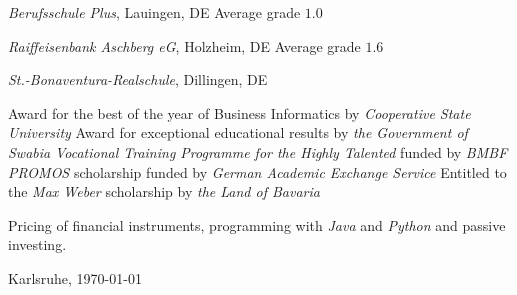 \documentclass[10pt]{article}
\begin{document}
 \vspace{0.01in} 
\newline \emph{Berufsschule Plus}, Lauingen, DE
\newline\noindent Average grade $1.0$
\medskip

 \vspace{0.01in} 
\newline \noindent \emph{Raiffeisenbank Aschberg eG}, Holzheim, DE
\newline\noindent Average grade $1.6$
\medskip

 \vspace{0.01in} 
\newline \noindent \emph{St.-Bonaventura-Realschule}, Dillingen, DE
\medskip

\medskip
{}
\noindent Award for the best of the year of Business Informatics by \textit{Cooperative State University} 
\medskip
\newline\noindent Award for exceptional educational results by \textit{the Government of Swabia} 
\medskip
\bigskip
{}
\newline\noindent \textit{Vocational Training Programme for the Highly Talented} funded by \textit{BMBF} 
\medskip
\newline\noindent \textit{PROMOS} scholarship funded by \textit{German Academic Exchange Service} 
\medskip
\newline\noindent Entitled to the \textit{Max Weber} scholarship by \textit{the Land of Bavaria} 
\medskip

\medskip
{}
\noindent Pricing of financial instruments, programming with \textit{Java} and \textit{Python} and passive investing.
\medskip
\newline\noindent
\bigskip

\bigskip
\noindent Karlsruhe, \today
\medskip
\end{document}
